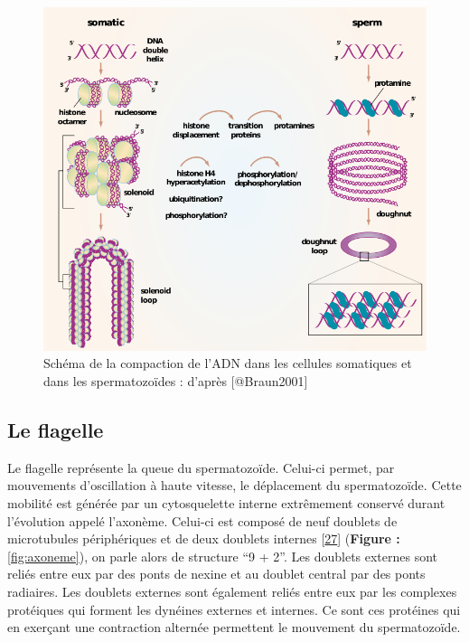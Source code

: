 \documentclass[12pt,twoside]{reedthesis}
\theoremstyle{definition}
\theoremstyle{definition}
\theoremstyle{remark}
\begin{document}
  \newpage
  
  \begin{figure}
  
  {\centering \includegraphics[scale=.55]{figure/noyau} 
  
  }
  
  \caption[Schéma de la compaction de l’ADN dans les cellules somatiques et dans les spermatozoïdes]{Schéma de la compaction de l’ADN dans les cellules somatiques et dans les spermatozoïdes : d'après [@Braun2001]}\label{fig:noyau}
  \end{figure}
  
  \newpage
  
  \subsection{Le flagelle}\label{le-flagelle}
  
  Le flagelle représente la queue du spermatozoïde. Celui-ci permet, par
  mouvements d'oscillation à haute vitesse, le déplacement du
  spermatozoïde. Cette mobilité est générée par un cytosquelette interne
  extrêmement conservé durant l'évolution appelé l'axonème. Celui-ci est
  composé de neuf doublets de microtubules périphériques et de deux
  doublets internes {[}\protect\hyperlink{ref-Inaba2003}{27}{]}
  (\textbf{Figure : }\ref{fig:axoneme}), on parle alors de structure ``9 +
  2''. Les doublets externes sont reliés entre eux par des ponts de nexine
  et au doublet central par des ponts radiaires. Les doublets externes
  sont également reliés entre eux par les complexes protéiques qui forment
  les dynéines externes et internes. Ce sont ces protéines qui en exerçant
  une contraction alternée permettent le mouvement du spermatozoïde.
  
\end{document}

